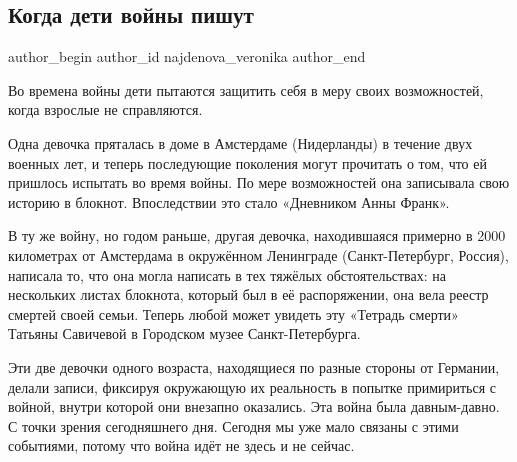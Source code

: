  
 
 
 
 
\subsection{Когда дети войны пишут}
\label{sec:03_01_2022.stz.news.de.berliner_telegraph.1.deti_vojna}

\ifcmt
 author_begin
   author_id najdenova_veronika
 author_end
\fi

\begin{zznagolos}
Во времена войны дети пытаются защитить себя в меру своих возможностей, когда
взрослые не справляются.	
\end{zznagolos}


Одна девочка пряталась в доме в Амстердаме (Нидерланды) в течение двух военных
лет, и теперь последующие поколения могут прочитать о том, что ей пришлось
испытать во время войны. По мере возможностей она записывала свою историю в
блокнот. Впоследствии это стало «Дневником Анны Франк».

В ту же войну, но годом раньше, другая девочка, находившаяся примерно в 2000
километрах от Амстердама в окружённом Ленинграде (Санкт-Петербург, Россия),
написала то, что она могла написать в тех тяжёлых обстоятельствах: на
нескольких листах блокнота, который был в её распоряжении, она вела реестр
смертей своей семьи. Теперь любой может увидеть эту «Тетрадь смерти» Татьяны
Савичевой в Городском музее Санкт-Петербурга.

Эти две девочки одного возраста, находящиеся по разные стороны от Германии,
делали записи, фиксируя окружающую их реальность в попытке примириться с
войной, внутри которой они внезапно оказались. Эта война была давным-давно. С
точки зрения сегодняшнего дня. Сегодня мы уже мало связаны с этими событиями,
потому что война идёт не здесь и не сейчас.


